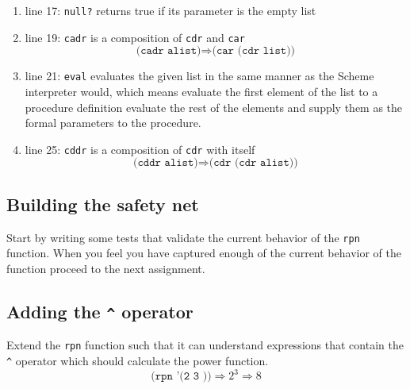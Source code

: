 \documentclass[12pt,a4paper,english,twoside]{article}
\begin{document}
\begin{enumerate}
  \item line 17: \texttt{null?} returns true if its parameter is the empty list
  \item line 19: \texttt{cadr} is a composition of \texttt{cdr} and \texttt{car} 
    \begin{equation*}
      \texttt{(cadr alist)} \Rightarrow \texttt{(car (cdr list))}
    \end{equation*}
  \item line 21: \texttt{eval} evaluates the given list in the same manner as the 
    Scheme interpreter would, which means evaluate the first element of the 
    list to a procedure definition evaluate the rest of the elements and 
    supply them as the formal parameters to the procedure.
  \item line 25: \texttt{cddr} is a composition of \texttt{cdr} with itself
    \begin{equation*}
      \texttt{(cddr alist)} \Rightarrow \texttt{(cdr (cdr alist))}
    \end{equation*}
\end{enumerate}
\subsection{Building the safety net}
Start by writing some tests that validate the current behavior of the 
\texttt{rpn} function. When you feel you have captured enough of the current 
behavior of the function proceed to the next assignment.
\subsection{Adding the \texttt{\^{}} operator}
Extend the \texttt{rpn} function such that it can understand expressions that 
contain the \texttt{\^{}} operator which should calculate the power function.  
\begin{equation*}
\texttt{(rpn '(2 3 \^{}))} \Rightarrow 2^{3} \Rightarrow 8 
\end{equation*}
\end{document}
